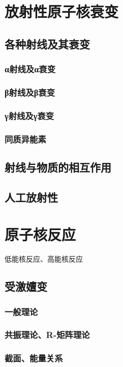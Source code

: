 \documentclass[UTF8]{../06-Physics}
\begin{document}
\section{放射性原子核衰变}
    \subsection{各种射线及其衰变}
        \subsubsection{α射线及α衰变}
        \subsubsection{β射线及β衰变}
        \subsubsection{γ射线及γ衰变}
        \subsubsection{同质异能素}
    \subsection{射线与物质的相互作用}
    \subsection{人工放射性}





\section{原子核反应}
低能核反应、高能核反应
    \subsection{受激嬗变}
        \subsubsection{一般理论}
        \subsubsection{共振理论、R-矩阵理论}
        \subsubsection{截面、能量关系}
\end{document}
